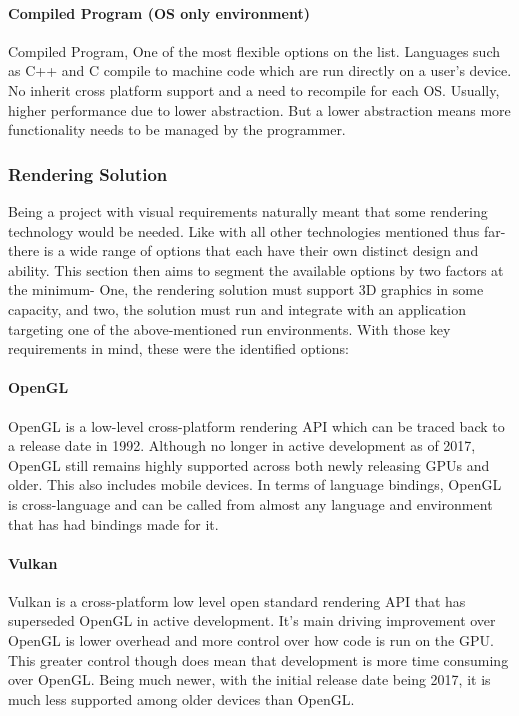 \paragraph{Compiled Program (OS only environment)}
Compiled Program, One of the most flexible options on the list. Languages such as C++ and C compile to machine code which are run directly on a user’s device. No inherit cross platform support and a need to recompile for each OS. Usually, higher performance due to lower abstraction. But a lower abstraction means more functionality needs to be managed by the programmer.

\subsubsection{Rendering Solution}
Being a project with visual requirements naturally meant that some rendering technology would be needed. Like with all other technologies mentioned thus far- there is a wide range of options that each have their own distinct design and ability. This section then aims to segment the available options by two factors at the minimum- One, the rendering solution must support 3D graphics in some capacity, and two, the solution must run and integrate with an application targeting one of the above-mentioned run environments. With those key requirements in mind, these were the identified options:

\paragraph{OpenGL}
OpenGL is a low-level cross-platform rendering API which can be traced back to a release date in 1992. Although no longer in active development as of 2017, OpenGL still remains highly supported across both newly releasing GPUs and older. This also includes mobile devices. In terms of language bindings, OpenGL is cross-language and can be called from almost any language and environment that has had bindings made for it.

\paragraph{Vulkan}
Vulkan is a cross-platform low level open standard rendering API that has superseded OpenGL in active development. It’s main driving improvement over OpenGL is lower overhead and more control over how code is run on the GPU. This greater control though does mean that development is more time consuming over OpenGL. Being much newer, with the initial release date being 2017, it is much less supported among older devices than OpenGL.

